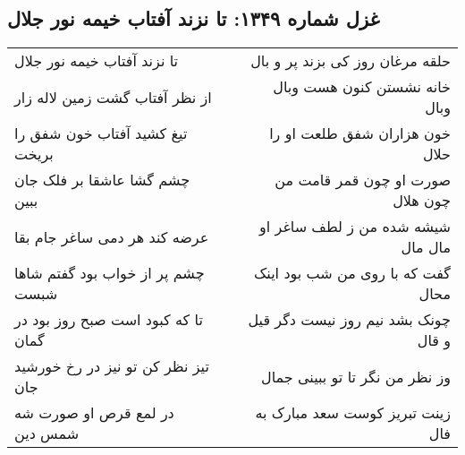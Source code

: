 \begin{center}
\section*{غزل شماره ۱۳۴۹: تا نزند آفتاب خیمه نور جلال}
\label{sec:1349}
\begin{longtable}{l p{0.5cm} r}
تا نزند آفتاب خیمه نور جلال
&&
حلقه مرغان روز کی بزند پر و بال
\\
از نظر آفتاب گشت زمین لاله زار
&&
خانه نشستن کنون هست وبال وبال
\\
تیغ کشید آفتاب خون شفق را بریخت
&&
خون هزاران شفق طلعت او را حلال
\\
چشم گشا عاشقا بر فلک جان ببین
&&
صورت او چون قمر قامت من چون هلال
\\
عرضه کند هر دمی ساغر جام بقا
&&
شیشه شده من ز لطف ساغر او مال مال
\\
چشم پر از خواب بود گفتم شاها شبست
&&
گفت که با روی من شب بود اینک محال
\\
تا که کبود است صبح روز بود در گمان
&&
چونک بشد نیم روز نیست دگر قیل و قال
\\
تیز نظر کن تو نیز در رخ خورشید جان
&&
وز نظر من نگر تا تو ببینی جمال
\\
در لمع قرص او صورت شه شمس دین
&&
زینت تبریز کوست سعد مبارک به فال
\\
\end{longtable}
\end{center}
